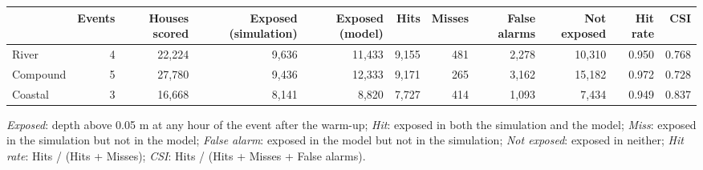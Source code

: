 \begin{tabular}{lrrrrrrrrrr}
\toprule
 & Events & Houses scored & Exposed (simulation) & Exposed (model) & Hits & Misses & False alarms & Not exposed & Hit rate & CSI \\
\midrule
River & 4 & 22,224 & 9,636 & 11,433 & 9,155 & 481 & 2,278 & 10,310 & 0.950 & 0.768 \\
Compound & 5 & 27,780 & 9,436 & 12,333 & 9,171 & 265 & 3,162 & 15,182 & 0.972 & 0.728 \\
Coastal & 3 & 16,668 & 8,141 & 8,820 & 7,727 & 414 & 1,093 & 7,434 & 0.949 & 0.837 \\
\bottomrule
\end{tabular}
\par\smallskip
{\footnotesize \textit{Exposed}: depth above 0.05 m at any hour of the event after the warm-up; \textit{Hit}: exposed in both the simulation and the model; \textit{Miss}: exposed in the simulation but not in the model; \textit{False alarm}: exposed in the model but not in the simulation; \textit{Not exposed}: exposed in neither; \textit{Hit rate}: Hits / (Hits + Misses); \textit{CSI}: Hits / (Hits + Misses + False alarms).}

